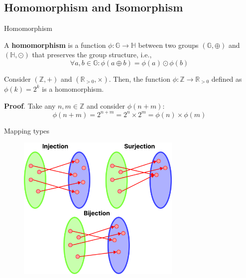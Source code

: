 \documentclass{beamer}
\begin{document}
  \subsection{Homomorphism and Isomorphism}

  \begin{frame}{Homomorphism}
    \begin{definition}
      A \textbf{homomorphism} is a function $\phi: \mathbb{G} \rightarrow \mathbb{H}$ between two groups $(\mathbb{G}, \oplus)$ and $(\mathbb{H}, \odot)$ that preserves the group structure, i.e., 
      \begin{equation*}
        \forall a,b \in \mathbb{G}: \phi(a \oplus b) = \phi(a) \odot \phi(b)
      \end{equation*}
    \end{definition}

    \begin{example}
      Consider $(\mathbb{Z}, +)$ and $(\mathbb{R}_{>0}, \times)$. Then, the function $\phi: \mathbb{Z} \rightarrow \mathbb{R}_{>0}$ defined as $\phi(k) = 2^k$ is a homomorphism.
    \end{example}

    \textbf{Proof}. Take any $n,m \in \mathbb{Z}$ and consider $\phi(n+m)$:
    \begin{equation*}
      \phi(n+m) = 2^{n+m} = 2^n \times 2^m = \phi(n) \times \phi(m)
    \end{equation*}
  \end{frame}

  \begin{frame}{Mapping types}
    \begin{figure}
      \includegraphics[width=0.7\textwidth]{images/lecture_1/mapping.pdf}
      \label{fig:mappings}
    \end{figure}
  \end{frame}
\end{document}
